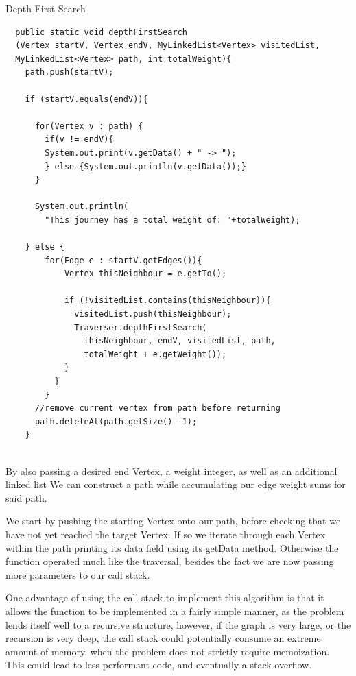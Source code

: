 \documentclass[a4paper]{article}
\begin{document}
\begin{algorithm}
\caption{Depth First Search}\label{euclid}

\begin{verbatim}
  public static void depthFirstSearch
  (Vertex startV, Vertex endV, MyLinkedList<Vertex> visitedList, 
  MyLinkedList<Vertex> path, int totalWeight){
    path.push(startV);

    if (startV.equals(endV)){

      for(Vertex v : path) {
        if(v != endV){
        System.out.print(v.getData() + " -> ");
        } else {System.out.println(v.getData());}
      }

      System.out.println(
        "This journey has a total weight of: "+totalWeight);

    } else {
        for(Edge e : startV.getEdges()){
            Vertex thisNeighbour = e.getTo();

            if (!visitedList.contains(thisNeighbour)){
              visitedList.push(thisNeighbour);
              Traverser.depthFirstSearch(
                thisNeighbour, endV, visitedList, path, 
                totalWeight + e.getWeight());
            }
          }
        }
      //remove current vertex from path before returning
      path.deleteAt(path.getSize() -1);
    }


\end{verbatim}
\end{algorithm}

By also passing a desired end Vertex, a weight integer, as well as an additional linked list
We can construct a path while accumulating our edge weight sums for said path.

We start by pushing the starting Vertex onto our path,
before checking that we have not yet reached the target Vertex.
If so we iterate through each Vertex within the path printing its data field using its getData method.
Otherwise the function operated much like the traversal, besides the fact we are now passing more parameters 
to our call stack. 
\newpage



\vspace{10mm}
One advantage of using the call stack to implement this  algorithm is that it allows the function to be implemented in a 
fairly simple manner, as the problem lends itself well to a recursive structure,
however, if the graph is very large, or the recursion is very deep, the call stack could potentially consume an extreme amount of memory,
when the problem does not strictly require memoization.
This could lead to less performant code, and eventually a stack overflow. \\
\vspace{4mm}
\end{document}
